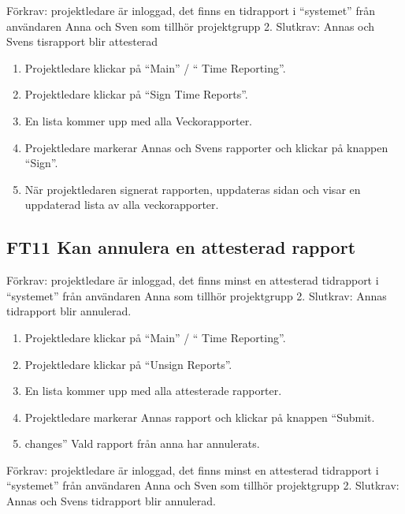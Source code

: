 \documentclass[paper=a4, fontsize=11pt,twoside]{article}
\begin{document}
		Förkrav: projektledare är inloggad, det finns en tidrapport i “systemet” från användaren  Anna och Sven som tillhör projektgrupp 2. 
		\newline
		Slutkrav: Annas och Svens tisrapport blir attesterad
		
		\begin{enumerate}
    		\item Projektledare klickar på “Main” / “ Time Reporting”.
			\item Projektledare klickar på “Sign Time Reports”.
			\item En lista kommer upp med alla Veckorapporter.
			\item Projektledare  markerar Annas och Svens rapporter och klickar på
			knappen “Sign”.
			\item När projektledaren signerat rapporten, uppdateras sidan och visar en
			uppdaterad lista av alla veckorapporter.

				  

		\end{enumerate}
		
		\subsection*{FT11 Kan annulera en attesterad rapport}
		
		Förkrav: projektledare är inloggad, det finns minst en attesterad tidrapport i “systemet” från användaren  Anna som tillhör projektgrupp 2. 
		\newline
		Slutkrav: Annas tidrapport blir annulerad.
		
		\begin{enumerate}
		  \item Projektledare klickar på “Main” / “ Time Reporting”.
		  \item Projektledare klickar på “Unsign Reports”.
		  \item En lista kommer upp med alla attesterade rapporter.
		  \item Projektledare markerar Annas rapport och klickar på knappen “Submit.
		  \item changes” Vald rapport från anna har annulerats.
		  
		\end{enumerate}
		
		Förkrav: projektledare är inloggad, det finns minst en attesterad tidrapport i “systemet” från användaren  Anna och Sven som tillhör projektgrupp 2. 
		\newline
		Slutkrav: Annas och Svens tidrapport blir annulerad.
		
\end{document}
